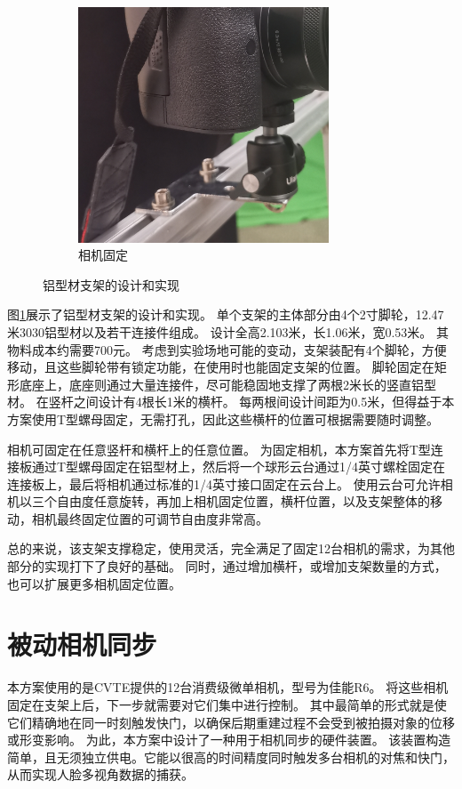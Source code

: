 \begin{figure}
\begin{subfigure}[b]{0.47\textwidth}
    \centering
    \includegraphics[height=7cm]{figures/frame-camera}
    \caption{相机固定}
\end{subfigure}
\caption{铝型材支架的设计和实现}
\label{fig:frame}
\end{figure}

图\ref{fig:frame}展示了铝型材支架的设计和实现。
单个支架的主体部分由4个2寸脚轮，12.47米3030铝型材以及若干连接件组成。
设计全高2.103米，长1.06米，宽0.53米。
其物料成本约需要700元。
考虑到实验场地可能的变动，支架装配有4个脚轮，方便移动，且这些脚轮带有锁定功能，在使用时也能固定支架的位置。
脚轮固定在矩形底座上，底座则通过大量连接件，尽可能稳固地支撑了两根2米长的竖直铝型材。
在竖杆之间设计有4根长1米的横杆。
每两根间设计间距为0.5米，但得益于本方案使用T型螺母固定，无需打孔，因此这些横杆的位置可根据需要随时调整。

相机可固定在任意竖杆和横杆上的任意位置。
为固定相机，本方案首先将T型连接板通过T型螺母固定在铝型材上，然后将一个球形云台通过1/4英寸螺栓固定在连接板上，最后将相机通过标准的1/4英寸接口固定在云台上。
使用云台可允许相机以三个自由度任意旋转，再加上相机固定位置，横杆位置，以及支架整体的移动，相机最终固定位置的可调节自由度非常高。

总的来说，该支架支撑稳定，使用灵活，完全满足了固定12台相机的需求，为其他部分的实现打下了良好的基础。
同时，通过增加横杆，或增加支架数量的方式，也可以扩展更多相机固定位置。

\section{被动相机同步}
\label{sec:passive_sync}

本方案使用的是CVTE提供的12台消费级微单相机，型号为佳能R6。
将这些相机固定在支架上后，下一步就需要对它们集中进行控制。
其中最简单的形式就是使它们精确地在同一时刻触发快门，以确保后期重建过程不会受到被拍摄对象的位移或形变影响。
为此，本方案中设计了一种用于相机同步的硬件装置。
该装置构造简单，且无须独立供电。它能以很高的时间精度同时触发多台相机的对焦和快门，从而实现人脸多视角数据的捕获。

